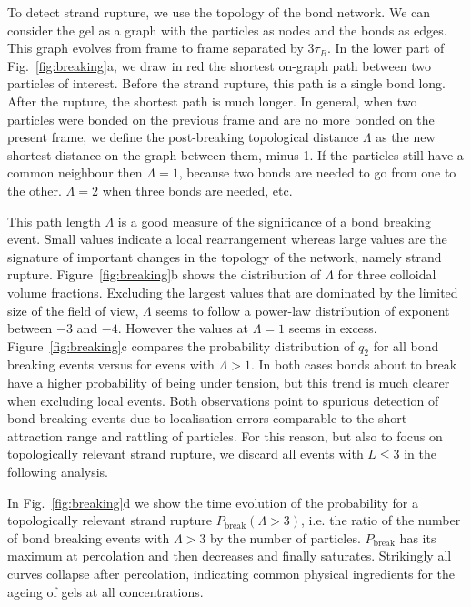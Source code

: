 \documentclass[preprint,footinbib,amsmath,amssymb]{revtex4}
\begin{document}
To detect strand rupture, we use the topology of the bond network. We can consider the gel as a graph with the particles as nodes and the bonds as edges. This graph evolves from frame to frame separated by $3\tau_B$. In the lower part of Fig.~\ref{fig:breaking}a, we draw in red the shortest on-graph path between two particles of interest. Before the strand rupture, this path is a single bond long. After the rupture, the shortest path is much longer. In general, when two particles were bonded on the previous frame and are no more bonded on the present frame, we define the post-breaking topological distance $\Lambda$ as the new shortest distance on the graph between them, minus 1. If the particles still have a common neighbour then $\Lambda=1$, because two bonds are needed to go from one to the other. $\Lambda=2$ when three bonds are needed, etc.

This path length $\Lambda$ is a good measure of the significance of a bond breaking event. Small values indicate a local rearrangement whereas large values are the signature of important changes in the topology of the network, namely strand rupture. Figure~\ref{fig:breaking}b shows the distribution of $\Lambda$ for three colloidal volume fractions. Excluding the largest values that are dominated by the limited size of the field of view, $\Lambda$ seems to follow a power-law distribution of exponent between $-3$ and $-4$. However the values at $\Lambda=1$ seems in excess. Figure~\ref{fig:breaking}c compares the probability distribution of $q_2$ for all bond breaking events versus for evens with $\Lambda>1$. In both cases bonds about to break have a higher probability of being under tension, but this trend is much clearer when excluding local events. Both observations point to spurious detection of bond breaking events due to localisation errors comparable to the short attraction range and rattling of particles. For this reason, but also to focus on topologically relevant strand rupture, we discard all events with $L \leq 3$ in the following analysis.

In Fig.~\ref{fig:breaking}d we show the time evolution of the probability for a topologically relevant strand rupture $P_\text{break}(\Lambda>3)$, i.e. the ratio of the number of bond breaking events with $\Lambda>3$ by the number of particles. $P_\text{break}$ has its maximum at percolation and then decreases and finally saturates. Strikingly all curves collapse after percolation, indicating common physical ingredients for the ageing of gels at all concentrations.
\end{document}
